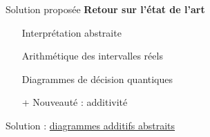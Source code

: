 \begin{frame}{Solution proposée}
    \textbf{Retour sur l'état de l'art}
    \begin{itemize}
        \item[\checkmark] Interprétation abstraite
        \item[\checkmark] Arithmétique des intervalles réels
        \item[\checkmark] Diagrammes de décision quantiques
        \item[+] Nouveauté : additivité
    \end{itemize}

    \begin{center}
        Solution : \underline{diagrammes additifs abstraits}
    \end{center}
\end{frame}
